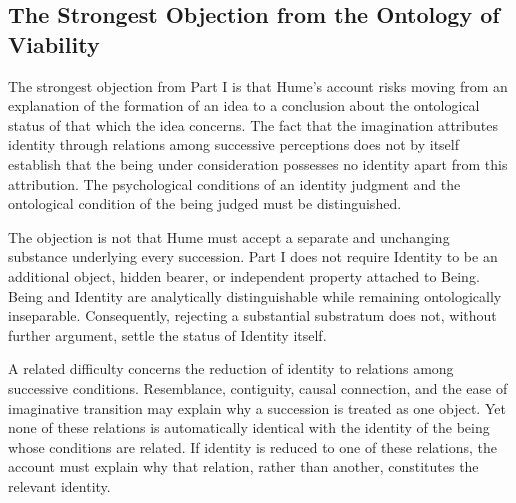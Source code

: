 \subsection{The Strongest Objection from the Ontology of Viability}
\label{subsec:ch08-hume-objection}

\label{para:VS.B01.P01.C08.S09.SS11.P001}

The strongest objection from Part I is that Hume's
account risks moving from an explanation of the
formation of an idea to a conclusion about the
ontological status of that which the idea concerns.
The fact that the imagination attributes identity
through relations among successive perceptions
does not by itself establish that the being under
consideration possesses no identity apart from
this attribution. The psychological conditions
of an identity judgment and the ontological
condition of the being judged must be distinguished.

\label{para:VS.B01.P01.C08.S09.SS11.P002}

The objection is not that Hume must accept a
separate and unchanging substance underlying
every succession. Part I does not require Identity
to be an additional object, hidden bearer, or
independent property attached to Being. Being
and Identity are analytically distinguishable
while remaining ontologically inseparable.
Consequently, rejecting a substantial substratum
does not, without further argument, settle the
status of Identity itself.

\label{para:VS.B01.P01.C08.S09.SS11.P003}

A related difficulty concerns the reduction of
identity to relations among successive conditions.
Resemblance, contiguity, causal connection, and
the ease of imaginative transition may explain
why a succession is treated as one object. Yet
none of these relations is automatically identical
with the identity of the being whose conditions
are related. If identity is reduced to one of
these relations, the account must explain why
that relation, rather than another, constitutes
the relevant identity.

\label{para:VS.B01.P01.C08.S09.SS11.P004}

